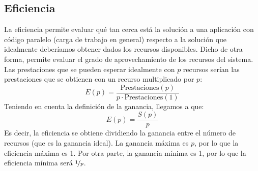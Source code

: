 \subsection{Eficiencia}
La eficiencia permite evaluar qué tan cerca está la solución a una aplicación con código paralelo (carga de trabajo en general) respecto a la solución que idealmente deberíamos obtener dados los recursos disponibles. Dicho de otra forma, permite evaluar el grado de aprovechamiento de los recursos del sistema. Las prestaciones que se pueden esperar idealmente con $p$ recursos serían las prestaciones que se obtienen con un recurso multiplicado por $p$:
\begin{equation*}
    E(p) = \dfrac{\text{Prestaciones}(p)}{p\cdot \text{Prestaciones}(1)}
\end{equation*}
Teniendo en cuenta la definición de la ganancia, llegamos a que:
\begin{equation}
    E(p) = \dfrac{S(p)}{p}
\end{equation}
Es decir, la eficiencia se obtiene dividiendo la ganancia entre el número de recursos (que es la ganancia ideal). La ganancia máxima es $p$, por lo que la eficiencia máxima es 1. Por otra parte, la ganancia mínima es 1, por lo que la eficiencia mínima será $\nicefrac{1}{p}$.


